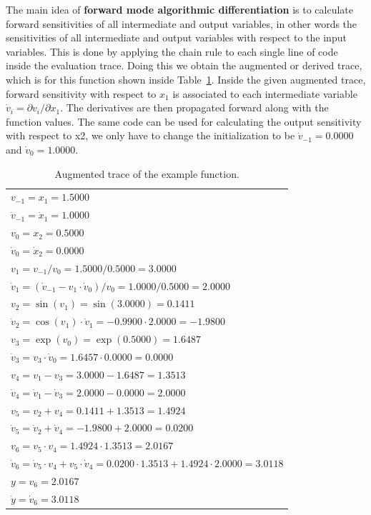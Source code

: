 \documentclass[12pt, a4paper]{article}
\begin{document}
The main idea of \textbf{forward mode algorithmic differentiation} is to calculate forward sensitivities of all intermediate and output variables, in other words the sensitivities of all intermediate and output variables with respect to the input variables.  This is done by applying the chain rule to each single line of code inside the evaluation trace. Doing this we obtain the augmented or derived trace, which is for this function shown inside Table~\ref{table:augmentedtrace}. Inside the given augmented trace, forward sensitivity with respect to $x_1$ is associated to each intermediate variable $\dot{v}_i = \partial v_i / \partial x_1$. The derivatives are then propagated forward along with the function values. The same code can be used for calculating the output sensitivity with respect to x2, we only have to change the initialization to be $\dot{v}_{-1} = 0.0000$ and $\dot{v}_0 = 1.0000$.\par
\begin{table}[h!]
    \centering
    \begin{tabular}{|l|}
         \hline
         $v_{-1} = x_1 = 1.5000$\\
         $\dot{v}_{-1} = \dot{x}_1 = 1.0000$\\
         $v_0 = x_2 = 0.5000$\\
         $\dot{v}_0 = \dot{x}_2 = 0.0000$\\
         \hline
         $v_1 = v_{-1}/v_0 = 1.5000 / 0.5000 = 3.0000$\\
         $\dot{v}_1 = (\dot{v}_{-1} - v_1 \cdot \dot{v}_0)/v_0 = 1.0000 / 0.5000 = 2.0000 $\\
         $v_2 = \sin(v_1) = \sin(3.0000) = 0.1411$\\
         $\dot{v}_2 = \cos(v_1) \cdot \dot{v}_1 = -0.9900 \cdot 2.0000 = -1.9800$\\
         $v_3 = \exp(v_0) = \exp(0.5000) = 1.6487$\\
         $\dot{v}_3 = v_3 \cdot \dot{v}_0 = 1.6457 \cdot 0.0000 = 0.0000 $\\
         $v_4 = v_1-v_3 = 3.0000 - 1.6487 = 1.3513$\\
         $\dot{v}_4 = \dot{v}_1 - \dot{v}_3= 2.0000 - 0.0000 = 2.0000$\\
         $v_5 = v_2+v_4 = 0.1411 + 1.3513 = 1.4924$\\
         $\dot{v}_5 = \dot{v}_2 + \dot{v}_4 = -1.9800 + 2.0000 = 0.0200$\\
         $v_6 = v_5\cdot v_4 = 1.4924 \cdot 1.3513 = 2.0167$\\
         $\dot{v}_6 = \dot{v}_5\cdot v_4 + v_5 \cdot \dot{v}_4 = 0.0200 \cdot 1.3513 + 1.4924 \cdot 2.0000 = 3.0118$\\
         \hline
         $y = v_6 = 2.0167$\\
         $\dot{y} = \dot{v}_6 = 3.0118$\\
         \hline
    \end{tabular}
    \caption{Augmented trace of the example function.}
    \label{table:augmentedtrace}
\end{table}
\end{document}
